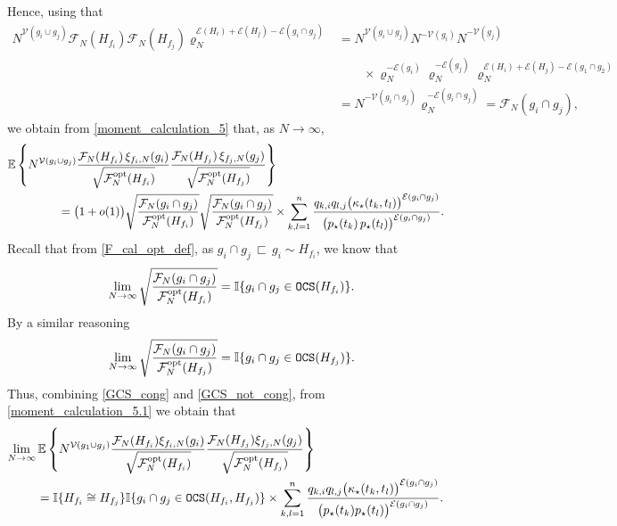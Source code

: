 \documentclass[11pt,reqno]{amsart}
\numberwithin{equation}{section}
\newcommand{\E}[1]{\mathbb{E}\left\{ #1\right\}}
\begin{document}
Hence, using that
\begin{align*}
    N^{\mathcal{V}(g_i\cup g_j)}\mathcal{F}_{{N}}({H}_{f_i})\mathcal{F}_{{N}}({H}_{f_j})\varrho_N^{\mathcal{E}({H}_i) + \mathcal{E}({H}_j) - \mathcal{E}({g_i\cap g_j})} &= N^{\mathcal{V}(g_i\cup g_j)}N^{- \mathcal{V}(g_i)}N^{-\mathcal{V}(g_j)}\\
    &\qquad\times\varrho_N^{-\mathcal{E}(g_i)}\varrho_N^{-\mathcal{E}(g_j)}\varrho_N^{\mathcal{E}({H}_i) + \mathcal{E}({H}_j) - \mathcal{E}(g_1\cap g_2)}\\
    &=N^{-\mathcal{V}(g_i\cap g_j)}\varrho_N^{-\mathcal{E}(g_i\cap g_j)}=\mathcal{F}_{{N}}(g_i\cap g_j),
\end{align*}
we obtain from \eqref{moment_calculation_5} that, as $N\to\infty$,
\begin{align}
    \E{N^{\mathcal{V}({g_i}\cup g_j)}\frac{\mathcal{F}_{{N}}({H}_{f_i})\,\xi_{f_i,{N}}(g_i)}{\sqrt{\mathcal{F}^{\rm opt}_N({H}_{f_i})}}\frac{\mathcal{F}_{{N}}({H}_{f_j})\,\xi_{f_j,{N}}(g_j)}{\sqrt{\mathcal{F}^{\rm opt}_N({H}_{f_j})}}}\notag\\&\hspace{-6.55cm}={\bigl(1+o(1)\bigr)} \sqrt{\frac{\mathcal{F}_N(g_i\cap g_j)}{\mathcal{F}^{\rm{opt}}_N({H}_{f_i})}}\sqrt{\frac{\mathcal{F}_N(g_i\cap g_j)}{\mathcal{F}^{\rm{opt}}_N({H}_{f_j})}}\label{moment_calculation_5.1}
    \times\sum_{k,l=1}^{n}\frac{q_{k,i}q_{l,j}\bigl(\kappa_{\star}({t_k,t_l})\bigr)^{\mathcal{E}(g_i\cap g_j)}}{\bigl(p_{\star}({t_k})\,p_{\star}({t_l})\bigr)^{\mathcal{E}(g_i\cap g_j)}}.
\end{align}
{Recall that from \eqref{F_cal_opt_def}, as $g_i\cap g_j {\,\sqsubset\,} g_i\sim {H}_{f_i}$, we know that 
\begin{align*}
    \lim_{N\to\infty}\sqrt{\frac{\mathcal{F}_N(g_i\cap g_j)}{\mathcal{F}^{\rm{opt}}_N({H}_{f_i})}} = \mathbb{I}\{g_i\cap g_j\in{\tt OCS}({H}_{f_i})\}.
\end{align*}
By a similar reasoning 
\begin{align*}
    \lim_{N\to\infty}\sqrt{\frac{\mathcal{F}_N(g_i\cap g_j)}{\mathcal{F}^{\rm{opt}}_N({H}_{f_j})}} = \mathbb{I}\{g_i\cap g_j\in{\tt OCS}({H}_{f_j})\}.
\end{align*}
}{Thus, combining \eqref{GCS_cong} and \eqref{GCS_not_cong}, from \eqref{moment_calculation_5.1} we obtain that} 
\begin{align}
    \lim_{N\to\infty}\E{N^{\mathcal{V}(g_1\cup g_j)}\frac{\mathcal{F}_{{N}}({H}_{f_i})\xi_{f_i,{N}}(g_i)}{\sqrt{\mathcal{F}^{\rm opt}_N({H}_{f_i})}}\frac{\mathcal{F}_{{N}}({H}_{f_j})\xi_{f_j,{N}}(g_j)}{\sqrt{\mathcal{F}^{\rm opt}_N({H}_{f_j})}}} \notag\\& \hspace{-8cm}=\mathbb{I}\{{H}_{f_i}\cong {H}_{f_j}\}\mathbb{I}\{g_i\cap g_j\in{\tt OCS}({H}_{f_i},{H}_{f_j})\}\label{moment_calculation_6}\times\sum_{k,l=1}^{n}\frac{q_{k,i}q_{l,j}\bigl(\kappa_{\star}({t_k,t_l})\bigr)^{\mathcal{E}(g_i\cap g_j)}}{\bigl(p_{\star}({t_k})p_{\star}({t_l})\bigr)^{\mathcal{E}(g_i\cap g_j)}}.
\end{align}
\end{document}
